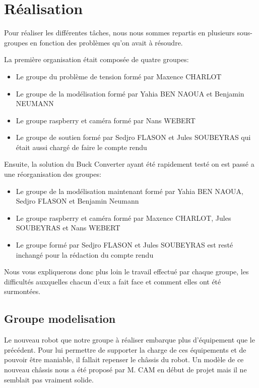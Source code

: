 \section{Réalisation}

Pour réaliser les différentes tâches, nous nous sommes repartis en plusieurs sous-groupes en fonction des problèmes qu'on avait à résoudre.

La première organisation était composée de quatre groupes:
\begin{itemize}
\item Le groupe du problème de tension formé par Maxence CHARLOT
\item Le groupe de la modélisation formé par Yahia BEN NAOUA et Benjamin NEUMANN
\item Le groupe raspberry et caméra formé par Nans WEBERT
\item Le groupe de soutien formé par Sedjro FLASON et Jules SOUBEYRAS qui était aussi chargé de faire le compte rendu
\end{itemize}

Ensuite, la solution du Buck Converter ayant été rapidement testé on est passé a une réorganisation des groupes:
\begin{itemize}
\item Le groupe de la modélisation maintenant formé par Yahia BEN NAOUA, Sedjro FLASON et Benjamin Neumann
\item Le groupe raspberry et caméra formé par Maxence CHARLOT, Jules SOUBEYRAS et Nans WEBERT
\item Le groupe formé par Sedjro FLASON et Jules SOUBEYRAS est resté inchangé pour la rédaction du compte rendu
\end{itemize}

Nous vous expliquerons donc plus loin le travail effectué par chaque groupe, les difficultés auxquelles chacun d'eux a fait face et comment elles ont été surmontées.

\subsection{Groupe modelisation}

Le nouveau robot que notre groupe à réaliser embarque plus d'équipement que le précédent. Pour lui permettre de supporter la charge de ces équipements et de pouvoir être maniable, il fallait repenser le châssis du robot. Un modèle de ce nouveau châssis nous a été proposé par M. CAM en début de projet mais il ne semblait pas vraiment solide.

